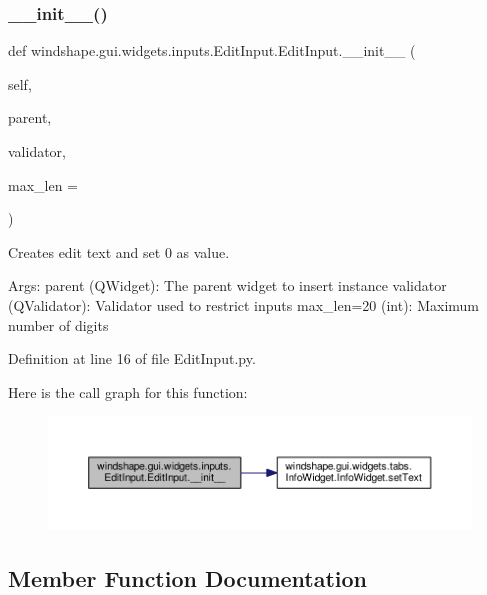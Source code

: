 \subsubsection{\texorpdfstring{\+\_\+\+\_\+init\+\_\+\+\_\+()}{\_\_init\_\_()}}
{\footnotesize\ttfamily def windshape.\+gui.\+widgets.\+inputs.\+Edit\+Input.\+Edit\+Input.\+\_\+\+\_\+init\+\_\+\+\_\+ (\begin{DoxyParamCaption}\item[{}]{self,  }\item[{}]{parent,  }\item[{}]{validator,  }\item[{}]{max\+\_\+len = {} }\end{DoxyParamCaption})}

\begin{DoxyVerb}Creates edit text and set 0 as value.

Args:
    parent (QWidget): The parent widget to insert instance
    validator (QValidator): Validator used to restrict inputs
    max_len=20 (int): Maximum number of digits
\end{DoxyVerb}
 

Definition at line 16 of file Edit\+Input.\+py.

Here is the call graph for this function\+:\nopagebreak
\begin{figure}[H]
\begin{center}
\leavevmode
\includegraphics[width=350pt]{classwindshape_1_1gui_1_1widgets_1_1inputs_1_1_edit_input_1_1_edit_input_aee4ec5bfb7c4fdd4d5bcf0a36ff65f52_cgraph}
\end{center}
\end{figure}


\subsection{Member Function Documentation}
\mbox{\label{classwindshape_1_1gui_1_1widgets_1_1inputs_1_1_edit_input_1_1_edit_input_aaf47986e36806c506bab5836f203259c}} 
